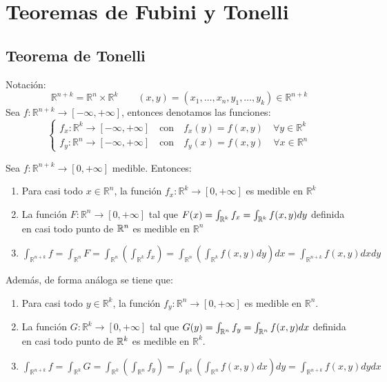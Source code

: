 \section{Teoremas de Fubini y Tonelli}

\subsection{Teorema de Tonelli}
Notación:
\[
    \mathbb{R}^{n+k} = \mathbb{R}^n \times \mathbb{R}^k \qquad (x, y)
    = (x_1, \dots, x_n, y_1, \dots, y_k) \in \mathbb{R}^{n+k}
\]
Sea $f: \mathbb{R}^{n+k} \to [-\infty, +\infty]$, entonces denotamos las
funciones:
\[
    \begin{cases}
        f_{x}: \mathbb{R}^k \to [-\infty,+ \infty] \quad \text{con} \quad f_{x}(y) = f(x, y) \quad \forall y \in \mathbb{R}^k \\
        f_{y}: \mathbb{R}^n \to [-\infty,+ \infty] \quad \text{con} \quad f_{y}(x) = f(x, y) \quad \forall x \in \mathbb{R}^n
    \end{cases}
\]

\begin{teorema}
    Sea $f : \mathbb{R}^{n+k} \to [0, +\infty]$ medible. Entonces:
    \vspace{-0.5em}
    \begin{enumerate}
        \item Para casi todo $x \in \mathbb{R}^n$, la función $f_{x} : \mathbb{R}^k \to [0,
                      +\infty]$ es medible en $\mathbb{R}^k$
        \item La función $F: \mathbb{R}^n \to [0, +\infty]$ tal que $F(x) =
                  \int_{\mathbb{R}^k}f_x = \int_{\mathbb{R}^k} f(x,y)dy$ definida en casi todo punto de
              $\mathbb{R}^n$ es medible en $\mathbb{R}^n$
        \item $\int_{\mathbb{R}^{n+k}}f = \int_{\mathbb{R}^n}F = \int_{\mathbb{R}^n}(\int_{\mathbb{R}^k}f_x) = \int_{\mathbb{R}^n}(\int_{\mathbb{R}^k}f(x,y)dy)dx = \int_{\mathbb{R}^{n+k}}f(x,y)dxdy$
    \end{enumerate}
    Además, de forma análoga se tiene que:
    \vspace{-0.5em}
    \begin{enumerate}
        \item Para casi todo $y \in \mathbb{R}^k$, la función $f_{y} : \mathbb{R}^n \to [0,
                      +\infty]$ es medible en $\mathbb{R}^n$.
        \item La función $G: \mathbb{R}^k \to [0, +\infty]$ tal que $G(y) =
                  \int_{\mathbb{R}^n}f_y = \int_{\mathbb{R}^n} f(x,y)dx$ definida en casi todo punto de
              $\mathbb{R}^k$ es medible en $\mathbb{R}^k$.
        \item $\int_{\mathbb{R}^{n+k}}f = \int_{\mathbb{R}^k}G = \int_{\mathbb{R}^k}(\int_{\mathbb{R}^n}f_y) = \int_{\mathbb{R}^k}(\int_{\mathbb{R}^n}f(x,y)dx)dy = \int_{\mathbb{R}^{n+k}}f(x,y)dydx$
    \end{enumerate}
\end{teorema}

